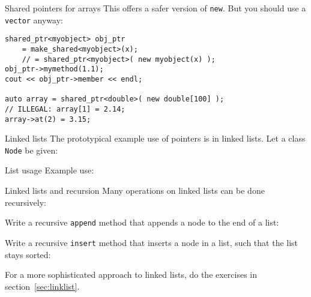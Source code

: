 \begin{slide}{Shared pointers for arrays}
This offers a safer version of \lstinline{new}. But you should use a
\lstinline{vector} anyway:
\begin{lstlisting}
shared_ptr<myobject> obj_ptr
    = make_shared<myobject>(x);
    // = shared_ptr<myobject>( new myobject(x) );
obj_ptr->mymethod(1.1);
cout << obj_ptr->member << endl;

auto array = shared_ptr<double>( new double[100] );
// ILLEGAL: array[1] = 2.14;
array->at(2) = 3.15;
\end{lstlisting}
\end{slide}

\begin{block}{Linked lists}
  \label{sl:linkedlistimpl}
  The prototypical example use of pointers is in linked lists. Let a
  class \lstinline{Node} be given:
  \begin{multicols}{2}
    \columnbreak
    \vfill\hbox{}
  \end{multicols}
\end{block}

\begin{block}{List usage}
\label{sl:linkedlistuse}
  Example use:
\end{block}

\begin{block}{Linked lists and recursion}
  \label{sl:linkedlistrecursive}
  Many operations on linked lists can be done recursively:
\end{block}

\begin{exercise}
  \label{ex:linkedlist1}
  Write a recursive \lstinline{append} method that appends a node to the end
  of a list:
\end{exercise}

\begin{exercise}
  \label{ex:linkedlist2}
  Write a recursive \lstinline{insert} method that inserts a node in a list, such that
  the list stays sorted:
\end{exercise}

\begin{exercise}
  \label{ex:linkedlist3}
  For a more sophisticated approach to linked lists, do the exercises
  in section~\ref{sec:linklist}.
\end{exercise}

